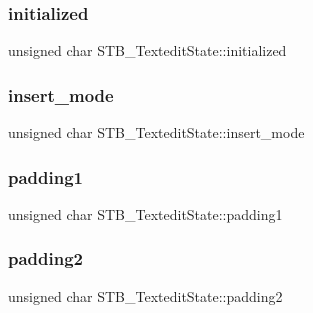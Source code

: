 \subsubsection{\texorpdfstring{initialized}{initialized}}
{\footnotesize\ttfamily unsigned char S\+T\+B\+\_\+\+Textedit\+State\+::initialized}

\hypertarget{struct_s_t_b___textedit_state_af26029a4f1f76d043afd35072fabcb4b}{}\label{struct_s_t_b___textedit_state_af26029a4f1f76d043afd35072fabcb4b} 
\subsubsection{\texorpdfstring{insert\+\_\+mode}{insert\_mode}}
{\footnotesize\ttfamily unsigned char S\+T\+B\+\_\+\+Textedit\+State\+::insert\+\_\+mode}

\hypertarget{struct_s_t_b___textedit_state_a1e43e8ac88a8c7f2bba645b333a8bdc7}{}\label{struct_s_t_b___textedit_state_a1e43e8ac88a8c7f2bba645b333a8bdc7} 
\subsubsection{\texorpdfstring{padding1}{padding1}}
{\footnotesize\ttfamily unsigned char S\+T\+B\+\_\+\+Textedit\+State\+::padding1}

\hypertarget{struct_s_t_b___textedit_state_af5a708e49f23f79bb14c9b0f4ad03371}{}\label{struct_s_t_b___textedit_state_af5a708e49f23f79bb14c9b0f4ad03371} 
\subsubsection{\texorpdfstring{padding2}{padding2}}
{\footnotesize\ttfamily unsigned char S\+T\+B\+\_\+\+Textedit\+State\+::padding2}

\hypertarget{struct_s_t_b___textedit_state_a4c42530e4919171df25b1f00bb95a887}{}\label{struct_s_t_b___textedit_state_a4c42530e4919171df25b1f00bb95a887} 
